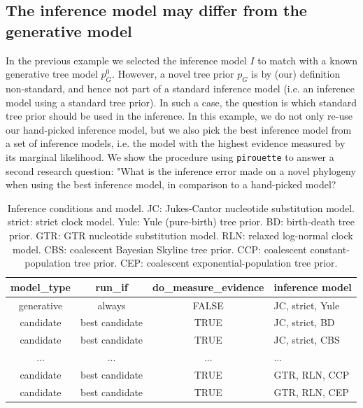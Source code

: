 \subsection{The inference model may differ from the generative model}

In the previous example we selected the inference model $\mathit{I}$ to match 
with a known generative tree model $\mathit{p_{G}^0}$.
However, a novel tree prior $\mathit{p_{G}}$ is by (our) definition
non-standard, and hence not part of a standard inference 
model (i.e. an inference model using a standard tree prior).
In such a case, the question is which standard tree prior should be used in 
the inference. In this example, we do not only re-use our hand-picked 
inference model, but we also pick the best inference model from a set of 
inference models, i.e.  the model with 
the highest evidence measured by its marginal likelihood. 
We show the procedure using \verb;pirouette; to answer a second 
research question: "What is the inference error made on a novel phylogeny 
when using the best inference model, in comparison to a hand-picked model?

\begin{table}
  \begin{tabular}{ | c | c | c | l | }
    \hline
    \textbf{model\_type} &
    \textbf{run\_if} &
    \textbf{do\_measure\_evidence} & 
    \textbf{inference model} \\ 
    \hline
    generative & always         & FALSE & JC, strict, Yule \\
    candidate  & best candidate & TRUE  & JC, strict, BD   \\
    candidate  & best candidate & TRUE  & JC, strict, CBS  \\
    ...        & ...            & ...   & ...              \\
    candidate  & best candidate & TRUE  & GTR, RLN, CCP    \\
    candidate  & best candidate & TRUE  & GTR, RLN, CEP    \\
    \hline
  \end{tabular}
  \caption{
    Inference conditions and model.
    JC: Jukes-Cantor nucleotide substitution model.
    strict: strict clock model.
    Yule: Yule (pure-birth) tree prior.
    BD: birth-death tree prior.
    GTR: GTR nucleotide substitution model.
    RLN: relaxed log-normal clock model.
    CBS: coalescent Bayesian Skyline tree prior.
    CCP: coalescent constant-population tree prior.
    CEP: coalescent exponential-population tree prior.
  }
  \label{tab:RQ2}
\end{table}

